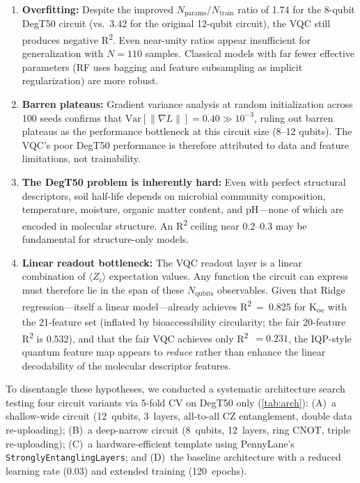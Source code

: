 \documentclass[12pt,a4paper]{article}
\newcommand{\degtl}{DegT50}
\newcommand{\koc}{K\textsubscript{oc}}
\newcommand{\rtwo}{R\textsuperscript{2}}
\begin{document}
\begin{enumerate}
  \item \textbf{Overfitting:} Despite the improved
        $N_\text{params}/N_\text{train}$ ratio of 1.74 for the 8-qubit
        \degtl{} circuit (vs.\ 3.42 for the original 12-qubit circuit),
        the VQC still produces negative \rtwo{}. Even near-unity ratios
        appear insufficient for generalization with $N = 110$ samples.
        Classical models with far fewer effective parameters (RF uses
        bagging and feature subsampling as implicit regularization) are
        more robust.

  \item \textbf{Barren plateaus:} Gradient variance analysis at random
        initialization across 100 seeds confirms that
        $\mathrm{Var}[\|\nabla L\|] = 0.40 \gg 10^{-3}$, ruling out barren
        plateaus\cite{mcclean2018} as the performance bottleneck at this
        circuit size (8--12 qubits). The VQC's poor \degtl{} performance
        is therefore attributed to data and feature limitations, not
        trainability.

  \item \textbf{The DegT50 problem is inherently hard:} Even with perfect
        structural descriptors, soil half-life depends on microbial
        community composition, temperature, moisture, organic matter
        content, and pH---none of which are encoded in molecular structure.
        An \rtwo{} ceiling near 0.2--0.3 may be fundamental for
        structure-only models.

  \item \textbf{Linear readout bottleneck:} The VQC readout layer is a
        linear combination of $\langle Z_i \rangle$ expectation values.
        Any function the circuit can express must therefore lie in the
        span of these $N_\text{qubits}$ observables. Given that Ridge
        regression---itself a linear model---already achieves \rtwo{}~=~0.825
        for \koc{} with the 21-feature set (inflated by bioaccessibility
        circularity; the fair 20-feature \rtwo{} is 0.532),
        and that the fair VQC achieves only \rtwo{}~$= 0.231$, the IQP-style
        quantum feature map appears to \emph{reduce} rather than enhance
        the linear decodability of the molecular descriptor features.
\end{enumerate}

To disentangle these hypotheses, we conducted a systematic architecture
search testing four circuit variants via 5-fold CV on \degtl{} only
(\cref{tab:arch}): (A)~a shallow-wide circuit (12~qubits, 3~layers,
all-to-all CZ entanglement, double data re-uploading); (B)~a deep-narrow
circuit (8~qubits, 12~layers, ring CNOT, triple re-uploading);
(C)~a hardware-efficient template using PennyLane's
\texttt{StronglyEntanglingLayers}; and (D)~the baseline architecture with
a reduced learning rate (0.03) and extended training (120~epochs).
\end{document}
